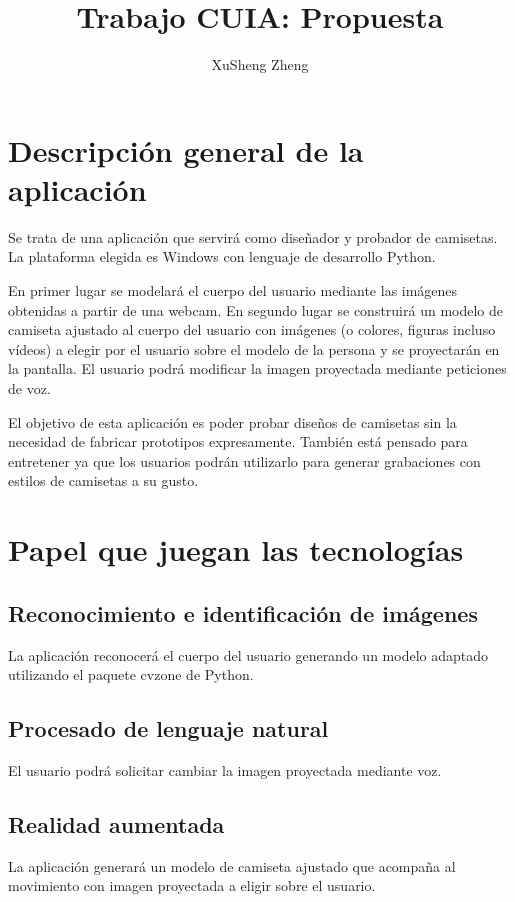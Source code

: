 \documentclass[twoside]{article}
\title{Trabajo CUIA: Propuesta}
\author{XuSheng Zheng}
\date{}
\begin{document}
\maketitle
\section{Descripción general de la aplicación}
Se trata de una aplicación que servirá como diseñador y probador de camisetas. La plataforma elegida es Windows con lenguaje de desarrollo Python.

En primer lugar se modelará el cuerpo del usuario mediante las imágenes obtenidas a partir de una webcam. En segundo lugar se construirá un modelo de camiseta ajustado al cuerpo del usuario con imágenes (o colores, figuras incluso vídeos) a elegir por el usuario sobre el modelo de la persona y se proyectarán en la pantalla. El usuario podrá modificar la imagen proyectada mediante peticiones de voz. 

El objetivo de esta aplicación es poder probar diseños de camisetas sin la necesidad de fabricar prototipos expresamente. También está pensado para entretener ya que los usuarios podrán utilizarlo para generar grabaciones con estilos de camisetas a su gusto.

\section{Papel que juegan las tecnologías}
\subsection{Reconocimiento e identificación de imágenes}
La aplicación reconocerá el cuerpo del usuario generando un modelo adaptado utilizando el paquete cvzone de Python.
\subsection{Procesado de lenguaje natural}
El usuario podrá solicitar cambiar la imagen proyectada mediante voz.
\subsection{Realidad aumentada}
La aplicación generará un modelo de camiseta ajustado que acompaña al movimiento con imagen proyectada a eligir sobre el usuario.
\end{document}
